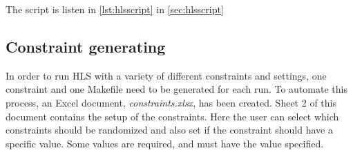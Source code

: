 The script is listen in \cref{lst:hlsscript} in \cref{sec:hlsscript}

\subsection{Constraint generating}
In order to run HLS with a variety of different constraints and settings, one constraint and one Makefile need to be generated for each run. To automate this process, an Excel document, \textit{constraints.xlsx}, has been created. Sheet 2 of this document contains the setup of the constraints. Here the user can select which constraints should be randomized and also set if the constraint should have a specific value. Some values are required, and must have the value specified.
